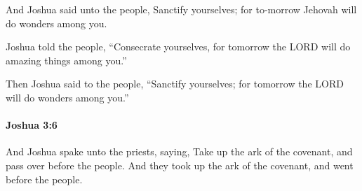 			\begin{versebox}
					\item[BHS] 
					\item[ASV] And Joshua said unto the people, Sanctify yourselves; for to-morrow Jehovah will do wonders among you.
					\item[NIV] Joshua told the people, “Consecrate yourselves, for tomorrow the LORD will do amazing things among you.”
					\item[NRSV] Then Joshua said to the people, “Sanctify yourselves; for tomorrow the LORD will do wonders among you.”
			\end{versebox}

		\paragraph{Joshua 3:6} %
			\label{JOSHUA-3-6}

			And Joshua spake unto the priests, saying, Take up the ark of the covenant, and pass over before the people. And they took up the ark of the covenant, and went before the people.

